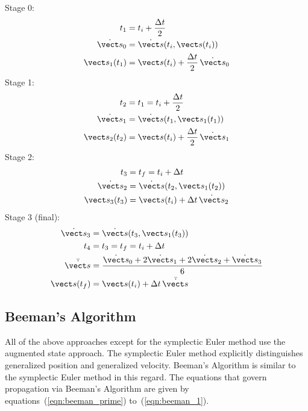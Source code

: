 Stage 0:
\begin{equation}
\label{eqn:rk4_0}
\begin{split}
t_1 &= t_i + \frac{\Delta t}2 \\
\dot{\vect s}_0 &= \dot{\vect s}(t_i,\vect s(t_i)) \\
\vect s_1(t_1) &= \vect s(t_i) + \frac{\Delta t}2 \, \dot{\vect s}_0
\end{split}
\end{equation}
Stage 1:
\begin{equation}
\label{eqn:rk4_1}
\begin{split}
t_2 &= t_1 = t_i + \frac{\Delta t}2 \\
\dot{\vect s}_1 &= \dot{\vect s}(t_1,\vect s_1(t_1)) \\
\vect s_2(t_2) &= \vect s(t_i) + \frac{\Delta t}2 \, \dot{\vect s}_1
\end{split}
\end{equation}
Stage 2:
\begin{equation}
\label{eqn:rk4_2}
\begin{split}
t_3 &= t_f = t_i + \Delta t \\
\dot{\vect s}_2 &= \dot{\vect s}(t_2,\vect s_1(t_2)) \\
\vect s_3(t_3) &= \vect s(t_i) + \Delta t \, \dot{\vect s}_2
\end{split}
\end{equation}
Stage 3 (final):
\begin{equation}
\label{eqn:rk4_3}
\begin{split}
\dot{\vect s}_3 &= \dot{\vect s}(t_3,\vect s_1(t_3)) \\
t_4 &= t_3 = t_f = t_i + \Delta t \\
\bar {\dot{\vect s}} &=
  \frac{\dot{\vect s}_0 + 2\dot{\vect s}_1 +
        2\dot{\vect s}_2+\dot{\vect s}_3} 6 \\
\vect s(t_f) &= \vect s(t_i) + \Delta t \, \bar {\dot{\vect s}}
\end{split}
\end{equation}

\subsection{Beeman's Algorithm}\label{sec:math_form_beeman}
All of the above approaches except for the symplectic Euler method
use the augmented state approach. The symplectic Euler method
explicitly distinguishes generalized position and generalized velocity.
Beeman's Algorithm is similar to the symplectic Euler method in this regard.
The equations that govern propagation via Beeman's Algorithm are given by
equations~(\ref{eqn:beeman_prime}) to~(\ref{eqn:beeman_1})\cite{beeman:1976}.

